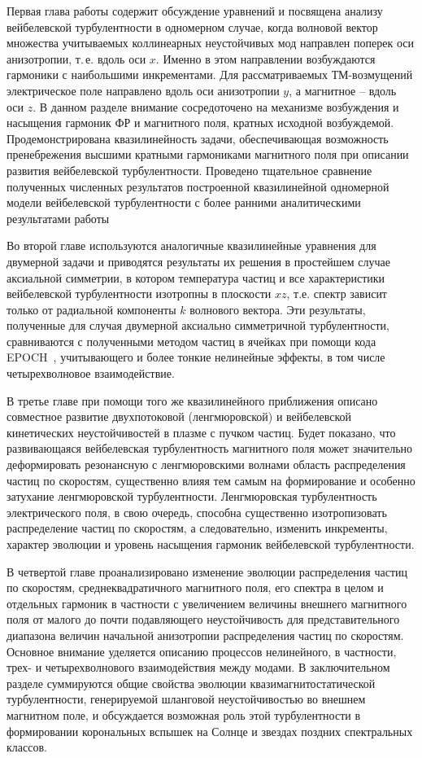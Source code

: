Первая глава работы содержит обсуждение уравнений и посвящена анализу вейбелевской турбулентности в одномерном случае, когда волновой вектор множества учитываемых коллинеарных неустойчивых мод направлен поперек оси анизотропии, т.\,е. вдоль оси $x$. Именно в этом направлении возбуждаются гармоники с наибольшими инкрементами. Для рассматриваемых ТМ-возмущений электрическое поле направлено вдоль оси анизотропии $y$, а магнитное -- вдоль оси $z$.  В данном разделе внимание сосредоточено на механизме возбуждения и насыщения гармоник ФР и магнитного поля, кратных исходной возбуждемой. Продемонстрирована квазилинейность задачи, обеспечивающая возможность пренебрежения высшими кратными гармониками магнитного поля при описании развития вейбелевской турбулентности. Проведено тщательное сравнение полученных численных результатов построенной квазилинейной одномерной модели вейбелевской турбулентности с более ранними аналитическими результатами работы~\cite{Pokhotelov2011}

Во второй главе используются аналогичные квазилинейные уравнения для двумерной задачи и приводятся результаты их решения в простейшем случае аксиальной симметрии, в котором температура частиц и все характеристики вейбелевской турбулентности изотропны в плоскости $xz$, т.е. спектр зависит только от радиальной компоненты $k$ волнового вектора. Эти результаты, полученные для случая двумерной аксиально симметричной турбулентности, сравниваются с полученными методом частиц в ячейках при помощи кода EPOCH~\cite{Arber2015}, учитывающего и более тонкие нелинейные эффекты, в том числе четырехволновое взаимодействие. 

В третье главе при помощи того же квазилинейного приближения описано совместное развитие двухпотоковой (ленгмюровской) и вейбелевской кинетических неустойчивостей в плазме с пучком частиц. Будет показано, что развивающаяся вейбелевская турбулентность магнитного поля может значительно деформировать резонансную с ленгмюровскими волнами область распределения частиц по скоростям, существенно влияя тем самым на формирование и особенно затухание ленгмюровской турбулентности. Ленгмюровская турбулентность электрического поля, в свою очередь, способна существенно изотропизовать распределение частиц по скоростям, а следовательно, изменить инкременты, характер эволюции и уровень насыщения гармоник вейбелевской турбулентности.

В четвертой главе проанализировано  изменение эволюции распределения частиц по скоростям, среднеквадратичного магнитного поля, его спектра в целом и отдельных гармоник в частности с увеличением величины внешнего магнитного поля от малого до почти подавляющего неустойчивость для представительного диапазона величин начальной анизотропии распределения частиц по скоростям. Основное внимание уделяется описанию  процессов нелинейного, в частности, трех- и четырехволнового взаимодействия между модами. В заключительном разделе суммируются общие свойства эволюции квазимагнитостатической турбулентности, генерируемой шланговой неустойчивостью во внешнем магнитном поле, и обсуждается возможная роль этой турбулентности в формировании корональных вспышек на Солнце и звездах поздних спектральных классов.

